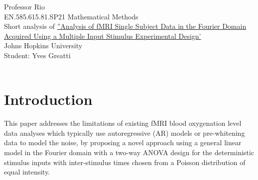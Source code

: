 \documentclass[12pt,twoside]{article}
\begin{document}
\noindent Professor Rio\\
EN.585.615.81.SP21 Mathematical Methods\\
Short analysis of \href{https://blackboard.jhu.edu/courses/1/EN.585.615.81.SP21/db/_11111758_1/JSIP20120400006_16101005.pdf}{''Analysis of fMRI Single Subject Data in the Fourier Domain Acquired Using a Multiple Input Stimulus Experimental Design'} \\
Johns Hopkins University\\
Student: Yves Greatti\\\

\section*{Introduction}
This paper addresses the limitations of existing fMRI blood oxygenation level data analyses which typically use autoregressive (AR) models 
or pre-whitening data to model the noise, by proposing a novel approach using a general linear model in the Fourier domain
with a two-way ANOVA design for the deterministic stimulus inputs with inter-stimulus times chosen from a Poisson distribution of equal intensity.
\end{document}
